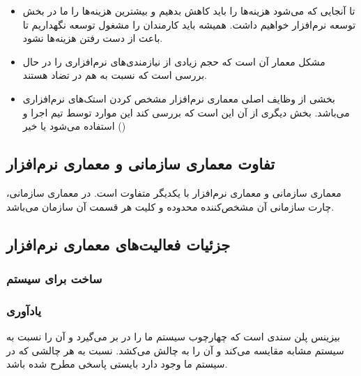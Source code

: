 \begin{itemize}
    \item تا آنجایی که می‌شود هزینه‌ها را باید کاهش بدهیم و بیشترین هزینه‌ها را
    ما در بخش توسعه نرم‌افزار خواهیم داشت. همیشه باید کارمندان را مشغول توسعه
    نگهداریم تا باعث از دست رفتن هزینه‌ها نشود.
    \item مشکل معمار آن است که حجم زیادی از نیازمندی‌های نرم‌افزاری را در حال
    بررسی است که نسبت به هم در تضاد هستند.
    \item بخشی از وظایف اصلی معماری نرم‌افزار مشخص کردن استک‌های نرم‌افزاری
    می‌باشد. بخش دیگری از آن این است که بررسی کند این موارد توسط تیم اجرا و
    استفاده می‌شود یا خیر ()
\end{itemize}

\subsection{تفاوت معماری سازمانی و معماری نرم‌افزار}

معماری سازمانی و معماری نرم‌افزار با یکدیگر متفاوت است. در معماری سازمانی، چارت
سازمانی آن مشخص‌کننده محدوده و کلیت هر قسمت آن سازمان می‌باشد.





\subsection{جزئیات فعالیت‌های معماری نرم‌افزار}

\subsubsection{ساخت  برای سیستم}

\subsubsection*{یادآوری }
بیزینس پلن سندی است که چهارچوب سیستم ما را در بر می‌گیرد و آن را نسبت به سیستم
مشابه مقایسه می‌کند و آن را به چالش می‌کشد. نسبت به هر چالشی که در سیستم ما وجود
دارد بایستی پاسخی مطرح شده باشد.

